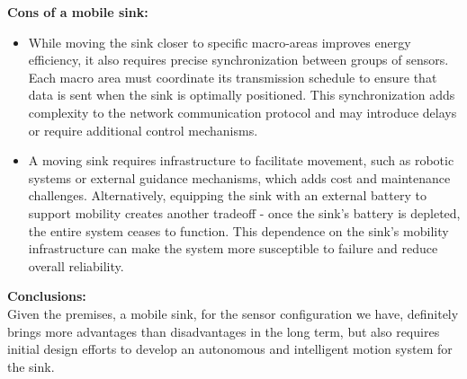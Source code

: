 \textbf{Cons of a mobile sink:} 
\begin{itemize}
\item While moving the sink closer to specific macro-areas improves energy efficiency, it also requires precise synchronization between groups of sensors. Each macro area must coordinate its transmission schedule to ensure that data is sent when the sink is optimally positioned. This synchronization adds complexity to the network communication protocol and may introduce delays or require additional control mechanisms.

\item A moving sink requires infrastructure to facilitate movement, such as robotic systems or external guidance mechanisms, which adds cost and maintenance challenges. Alternatively, equipping the sink with an external battery to support mobility creates another tradeoff - once the sink's battery is depleted, the entire system ceases to function. This dependence on the sink's mobility infrastructure can make the system more susceptible to failure and reduce overall reliability.
\end{itemize}

\textbf{Conclusions:} \\
Given the premises, a mobile sink, for the sensor configuration we have, definitely brings more advantages than disadvantages in the long term, but also requires initial design efforts to develop an autonomous and intelligent motion system for the sink.






